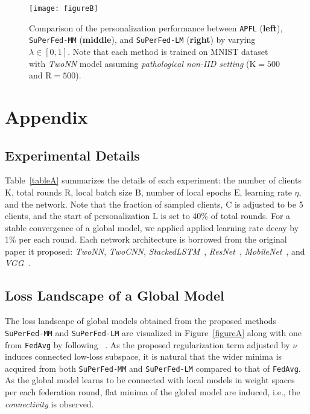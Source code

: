 \documentclass[sigconf]{acmart}
\begin{document}
\begin{figure*}[!htbp]
\centering
\texttt{[image: figureB]}
\caption{Comparison of the personalization performance between \texttt{APFL} (\textbf{left}), \texttt{SuPerFed-MM} (\textbf{middle}), and \texttt{SuPerFed-LM} (\textbf{right}) by varying $\lambda\in[0,1]$. Note that each method is trained on MNIST dataset with \textit{TwoNN} model assuming \textit{pathological non-IID setting} ($\mathrm{K}=500$ and $\mathrm{R}=500$).}
\label{figureB}
\end{figure*}

\section{Appendix}
\subsection{Experimental Details}
Table~\ref{tableA} summarizes the details of each experiment: the number of clients $\mathrm{K}$, total rounds $\mathrm{R}$, local batch size $\mathrm{B}$, number of local epochs $\mathrm{E}$, learning rate $\eta$, and the network. Note that the fraction of sampled clients, $\mathrm{C}$ is adjusted to be 5 clients, and the start of personalization $\mathrm{L}$ is set to 40\% of total rounds. For a stable convergence of a global model, we applied applied learning rate decay by 1\% per each round. Each network architecture is borrowed from the original paper it proposed: \textit{TwoNN}, \textit{TwoCNN}, \textit{StackedLSTM}~\cite{mc+17}, \textit{ResNet}~\cite{resnet}, \textit{MobileNet}~\cite{mobilenet}, and \textit{VGG}~\cite{vgg}. 

\subsection{Loss Landscape of a Global Model} The loss landscape of global models obtained from the proposed methods \texttt{SuPerFed-MM} and \texttt{SuPerFed-LM} are visualized in Figure~\ref{figureA} along with one from \texttt{FedAvg} by following ~\cite{garipov+18}. As the proposed regularization term adjusted by $\nu$ induces connected low-loss subspace, it is natural that the wider minima is acquired from both \texttt{SuPerFed-MM} and \texttt{SuPerFed-LM} compared to that of \texttt{FedAvg}. As the global model learns to be connected with local models in weight spaces per each federation round, flat minima of the global model are induced, i.e., the \textit{connectivity} is observed. 
\end{document}
